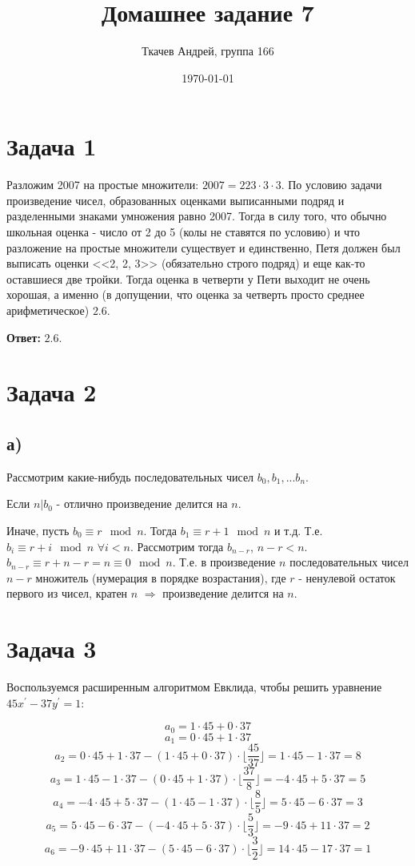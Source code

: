 \documentclass{article}
\title{Домашнее задание 7}
\author{Ткачев Андрей, группа 166}
\date{\today}
\begin{document}
	\maketitle
	\section {Задача 1}
	Разложим 2007 на простые множители: $2007 = 223 \cdot 3 \cdot 3$. По условию задачи произведение чисел, образованных оценками выписанными подряд и разделенными знаками умножения равно 2007. Тогда в силу того, что обычно школьная оценка - число от 2 до 5 (колы не ставятся по условию) и что разложение на простые множители существует и единственно, Петя должен был выписать оценки <<2, 2, 3>> (обязательно строго подряд) и еще как-то оставшиеся две тройки. Тогда оценка в четверти у Пети выходит не очень хорошая, а именно (в допущении, что оценка за четверть  просто среднее арифметическое) $2.6$.
	
	\textbf{Ответ:} $2.6$.
	
	\section {Задача 2}
	
	\subsection {а)} Рассмотрим какие-нибудь последовательных чисел $b_0, b_1, ... b_n$. 
	
	Если $n | b_0$ - отлично произведение делится на $n$.
	
	 Иначе, пусть $b_0 \equiv r \mod n$. Тогда $b_1 \equiv r + 1 \mod n$ и т.д. Т.е. $b_i \equiv r + i \mod n$ $\forall i < n$. Рассмотрим тогда $b_{n - r}$, $n - r < n$.
	 $b_{n - r} \equiv r + n - r = n \equiv 0 \mod n$. Т.е. в произведение $n$ последовательных чисел $n - r$ множитель (нумерация в порядке возрастания), где $r$ - ненулевой остаток первого из чисел, кратен $n$ $\Rightarrow$ произведение делится на $n$.
	
	\section{Задача 3}
		Воспользуемся расширенным алгоритмом Евклида, чтобы решить уравнение $45x^\prime - 37y^\prime = 1$:
		
		$$ a_0 = 1 \cdot 45 + 0 \cdot 37 $$ 
		$$ a_1 = 0 \cdot 45 + 1 \cdot 37 $$ 
		$$ a_2 = 0 \cdot 45 + 1 \cdot 37 - (1 \cdot 45 + 0 \cdot 37) \cdot \lfloor\frac{45} {37}\rfloor = 1 \cdot 45 - 1 \cdot 37 = 8 $$
		$$ a_3 = 1 \cdot 45 - 1 \cdot 37 - (0 \cdot 45 + 1 \cdot 37) \cdot \lfloor\frac{37} {8}\rfloor = -4 \cdot 45 + 5 \cdot 37 = 5 $$
		$$ a_4 = -4 \cdot 45 + 5 \cdot 37 - (1 \cdot 45 - 1 \cdot 37) \cdot \lfloor\frac{8} {5}\rfloor = 5 \cdot 45 - 6 \cdot 37 = 3 $$
		$$ a_5 = 5 \cdot 45 - 6 \cdot 37 - (-4 \cdot 45 + 5 \cdot 37) \cdot \lfloor\frac{5} {3}\rfloor = -9 \cdot 45 + 11 \cdot 37 = 2 $$
		$$ a_6 = -9 \cdot 45 + 11 \cdot 37 - (5 \cdot 45 - 6 \cdot 37) \cdot \lfloor\frac{3} {2}\rfloor = 14 \cdot 45 - 17 \cdot 37 = 1 $$
		
\end{document}
